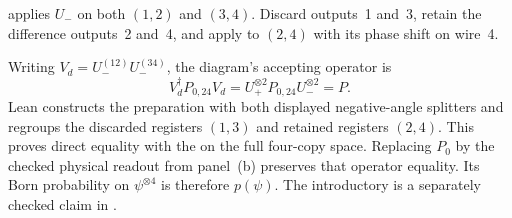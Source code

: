 \begin{theorem}\label{target:fig1-general}
  \par
  \leanok
   applies $U_-$ on both $(1,2)$ and $(3,4)$.
  Discard outputs~1 and~3, retain the difference outputs~2 and~4, and apply
   to $(2,4)$ with its phase shift on wire~4.

  Writing $V_d=U_-^{(12)}U_-^{(34)}$, the diagram's accepting operator is
  \[
    V_d^\dagger P_{0,24}V_d
      = U_+^{\otimes2}P_{0,24}U_-^{\otimes2}=P.
  \]
  Lean constructs the preparation with both displayed negative-angle splitters
  and regroups the discarded registers $(1,3)$ and retained registers $(2,4)$.
  This proves direct equality with the 
  on the full four-copy space. Replacing $P_0$ by the checked physical readout
  from panel~(b) preserves that operator equality. Its Born probability on
  $\psi^{\otimes4}$ is therefore $p(\psi)$.
  The introductory 
  is a separately checked claim in
  .
\end{theorem}

